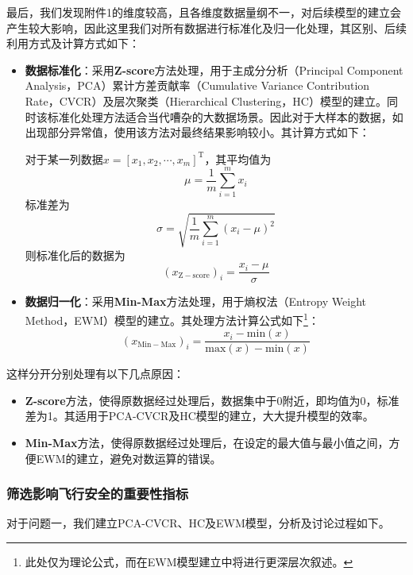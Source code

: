 \documentclass{MathorCupModeling}
\begin{document}
	最后，我们发现附件1的维度较高，且各维度数据量纲不一，对后续模型的建立会产生较大影响，因此这里我们对所有数据进行标准化及归一化处理，其区别、后续利用方式及计算方式如下：
	\begin{itemize}\label{数据标准化}
		\item \textbf{数据标准化}：采用\textbf{Z-score}方法处理，用于主成分分析（Principal Component Analysis，PCA）累计方差贡献率（Cumulative Variance Contribution Rate，CVCR）及层次聚类（Hierarchical Clustering，HC）模型的建立。同时该标准化处理方法适合当代嘈杂的大数据场景\textcolor{blue}{\cite{Paper:标准化}}。因此对于大样本的数据，如出现部分异常值，使用该方法对最终结果影响较小。其计算方式如下：
		
		对于某一列数据$x=\left[x_1,x_2,\cdots,x_m\right]^{\mathrm{T}}$，其平均值为
		\begin{equation}
			\mu=\frac{1}{m}\sum_{i=1}^{m}x_i \label{fmean}
		\end{equation}
		标准差为
		\begin{equation}
			\sigma=\sqrt{\frac{1}{m}\sum_{i=1}^{m}\left(x_i-\mu\right)^2} \label{fstd}
		\end{equation}
		则标准化后的数据为
		\begin{equation}
			\left(x_{\mathrm{Z-score}}\right)_i=\frac{x_i-\mu}{\sigma} \label{Z-score}
		\end{equation}
		\item \textbf{数据归一化}：采用\textbf{Min-Max}方法处理，用于熵权法（Entropy Weight Method，EWM）模型的建立。其处理方法计算公式如下\textcolor{blue}{\footnote{此处仅为理论公式，而在EWM模型建立中将进行更深层次叙述。}}：
		\begin{equation}
			\left(x_{\mathrm{Min-Max}}\right)_i=\frac{x_i-\mathrm{min}\left(x\right)}{\mathrm{max}\left(x\right)-\mathrm{min}\left(x\right)} \label{Min-Max}
		\end{equation}
	\end{itemize}
	这样分开分别处理有以下几点原因：
	\begin{itemize}
		\item \textbf{Z-score}方法，使得原数据经过处理后，数据集中于0附近，即均值为0，标准差为1。其适用于PCA-CVCR及HC模型的建立，大大提升模型的效率。
		\item \textbf{Min-Max}方法，使得原数据经过处理后，在设定的最大值与最小值之间，方便EWM的建立，避免对数运算的错误。
	\end{itemize}
	\subsubsection{筛选影响飞行安全的重要性指标}
	对于问题一，我们建立PCA-CVCR、HC及EWM模型，分析及讨论过程如下。
\end{document}
